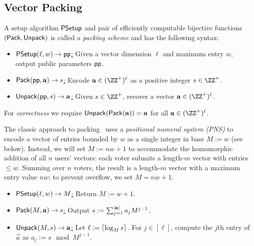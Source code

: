 \subsection{Vector Packing}\label{sec:packing}

\begin{definition}\label{def:packing}
A setup algorithm $\mathsf{PSetup}$ and pair of efficiently computable bijective functions $(\mathsf{Pack},\mathsf{Unpack})$ is called a \emph{packing scheme} and has the following syntax:
    \begin{itemize}
        \item \underline{$\mathsf{PSetup}(\ell, w) \to \mathsf{pp}$:} Given a vector dimension $\ell$ and maximum entry $w$, output public parameters $\mathsf{pp}$.
        \item \underline{$\pack(\pp, \Vec{a}) \to s$:} Encode $\Vec{a} \in (\ZZ^+)^\ell$ as a positive integer $s \in \ZZ^+$. 
        \item \underline{$\unpack(\pp, s) \to \Vec{a}$:} Given $s \in \ZZ^+$, recover a vector $\Vec{a} \in (\ZZ^+)^\ell$. 
    \end{itemize}
For \emph{correctness} we require $\unpack(\pack(\Vec{a}))=\Vec{a}$ for all $\Vec{a}\in (\ZZ^+)^\ell$.
\end{definition}

The classic approach to packing~\cite{ACNS:Groth05,EC:HirSak00} uses a \emph{positional numeral system (PNS)} to encode a vector of entries bounded by $w$ as a single integer in base $M := w$ (see  below).
Instead, we will set $M:= nw+1$ to accommodate the homomorphic addition of all $n$ users' vectors: each voter submits a length-$m$ vector with entries $\leq w$. Summing over $n$ voters, the result is a length-$m$ vector with a maximum entry value $nw$; to prevent overflow, we set $M = nw+1$.

\begin{construction}\label{con:packingPNS}
\hfill
\begin{itemize}%
    \item \underline{$\mathsf{PSetup}(\ell, w) \to M$:} Return $M := w + 1$.
    \item \underline{$\pack(M, \Vec{a}) \to s$:} Output $s := \sum_{j=1}^{\lvert \mathbf{a} \rvert} a_j M^{j-1}$.
    \item \underline{$\unpack(M, s) \to \Vec{a}$:} Let $\ell := \lceil \log_M{s} \rceil$. For $j \in [\ell]$, compute the $j$th entry of $\Vec{a}$ as $a_j := s \mod{M^{j-1}}$.
\end{itemize}
\end{construction}

